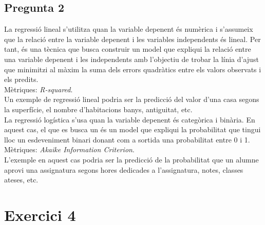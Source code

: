 \documentclass[a4paper,12pt]{report}
\begin{document}
\subsection*{Pregunta 2}
La regressió lineal s'utilitza quan la variable depenent és numèrica i s'assumeix que la relació entre la variable depenent i les variables independents és lineal. Per tant, és una tècnica que busca construir un model que expliqui la relació entre una variable depenent i les independents amb l'objectiu de trobar la línia d'ajust que minimitzi al màxim la suma dels errors quadràtics entre els valors observats i els predits.\\
Mètriques: \textit{R-squared}.\\
Un exemple de regressió lineal podria ser la predicció del valor d'una casa segons la superfície, el nombre d'habitacions banys, antiguitat, etc.\\
La regressió logística s'usa quan la variable depenent és categòrica i binària. En aquest cas, el que es busca un és un model que expliqui la probabilitat que tingui lloc un esdeveniment binari donant com a sortida una probabilitat entre 0 i 1.\\
Mètriques: \textit{Akaike Information Criterion}.\\
L'exemple en aquest cas podria ser la predicció de la probabilitat que un alumne aprovi una assignatura segons hores dedicades a l'assignatura, notes, classes ateses, etc.
\section*{Exercici 4}
\end{document}
